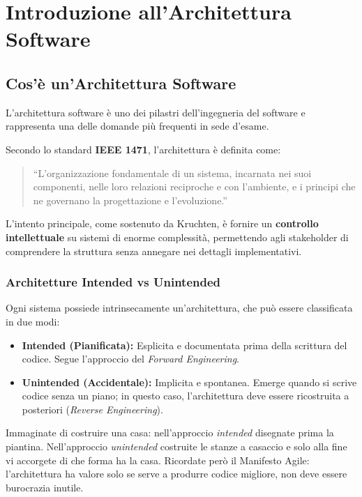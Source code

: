 \chapter{Introduzione all'Architettura Software}

\section{Cos'è un'Architettura Software}
\begin{notaesame}
L'architettura software è uno dei pilastri dell'ingegneria del software e rappresenta una delle domande più frequenti in sede d'esame.
\end{notaesame}

Secondo lo standard \textbf{IEEE 1471}, l'architettura è definita come:
\begin{quote}
    ``L'organizzazione fondamentale di un sistema, incarnata nei suoi componenti, nelle loro relazioni reciproche e con l'ambiente, e i principi che ne governano la progettazione e l'evoluzione.''
\end{quote}

L'intento principale, come sostenuto da Kruchten, è fornire un \textbf{controllo intellettuale} su sistemi di enorme complessità, permettendo agli stakeholder di comprendere la struttura senza annegare nei dettagli implementativi.

\subsection{Architetture Intended vs Unintended}
Ogni sistema possiede intrinsecamente un'architettura, che può essere classificata in due modi:
\begin{itemize}
    \item \textbf{Intended (Pianificata):} Esplicita e documentata prima della scrittura del codice. Segue l'approccio del \textit{Forward Engineering}.
    \item \textbf{Unintended (Accidentale):} Implicita e spontanea. Emerge quando si scrive codice senza un piano; in questo caso, l'architettura deve essere ricostruita a posteriori (\textit{Reverse Engineering}).
\end{itemize}

\begin{notaprof}
Immaginate di costruire una casa: nell'approccio \textit{intended} disegnate prima la piantina. Nell'approccio \textit{unintended} costruite le stanze a casaccio e solo alla fine vi accorgete di che forma ha la casa. Ricordate però il Manifesto Agile: l'architettura ha valore solo se serve a produrre codice migliore, non deve essere burocrazia inutile.
\end{notaprof}

